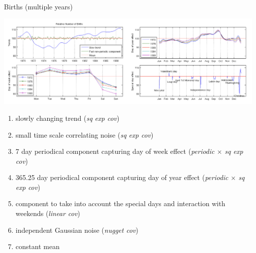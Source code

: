 \documentclass[11pt,ignorenonframetext,]{beamer}
\begin{document}
\begin{frame}{Births (multiple years)}

\begin{adjustwidth}{-10mm}{-10mm}
\begin{center}
\includegraphics[width=\paperwidth]{figs/births_pic2.png}
\end{center}
\end{adjustwidth}

\vspace{-3mm}

\footnotesize

\begin{enumerate}
\def\labelenumi{\arabic{enumi}.}
\item
  slowly changing trend (\emph{sq exp cov})
\item
  small time scale correlating noise (\emph{sq exp cov})
\item
  7 day periodical component capturing day of week effect
  (\emph{periodic \(\times\) sq exp cov})
\item
  365.25 day periodical component capturing day of year effect
  (\emph{periodic \(\times\) sq exp cov})
\item
  component to take into account the special days and interaction with
  weekends (\emph{linear cov})
\item
  independent Gaussian noise (\emph{nugget cov})
\item
  constant mean
\end{enumerate}

\end{frame}
\end{document}
